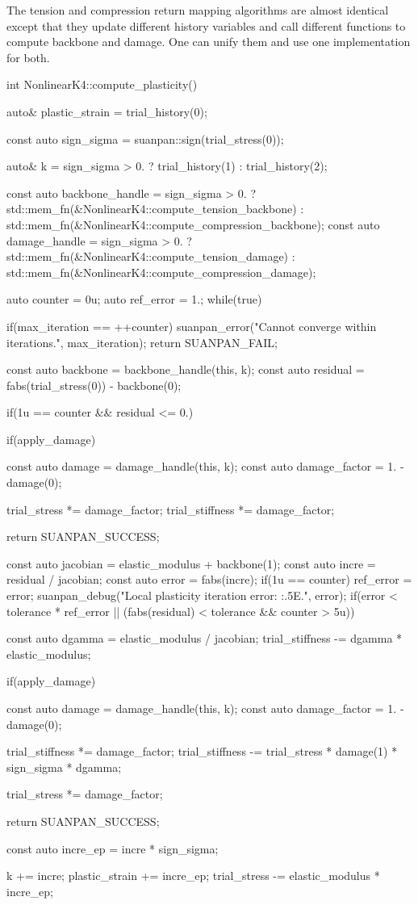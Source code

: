 The tension and compression return mapping algorithms are almost identical except that they update different history variables and call different functions to compute backbone and damage. One can unify them and use one implementation for both.
\begin{cppcode}
int NonlinearK4::compute_plasticity() {
    auto& plastic_strain = trial_history(0);

    const auto sign_sigma = suanpan::sign(trial_stress(0));

    auto& k = sign_sigma > 0. ? trial_history(1) : trial_history(2);

    const auto backbone_handle = sign_sigma > 0. ? std::mem_fn(&NonlinearK4::compute_tension_backbone) : std::mem_fn(&NonlinearK4::compute_compression_backbone);
    const auto damage_handle = sign_sigma > 0. ? std::mem_fn(&NonlinearK4::compute_tension_damage) : std::mem_fn(&NonlinearK4::compute_compression_damage);

    auto counter = 0u;
    auto ref_error = 1.;
    while(true) {
        if(max_iteration == ++counter) {
            suanpan_error("Cannot converge within {} iterations.\n", max_iteration);
            return SUANPAN_FAIL;
        }

        const auto backbone = backbone_handle(this, k);
        const auto residual = fabs(trial_stress(0)) - backbone(0);

        if(1u == counter && residual <= 0.) {
            if(apply_damage) {
                const auto damage = damage_handle(this, k);
                const auto damage_factor = 1. - damage(0);

                trial_stress *= damage_factor;
                trial_stiffness *= damage_factor;
            }

            return SUANPAN_SUCCESS;
        }

        const auto jacobian = elastic_modulus + backbone(1);
        const auto incre = residual / jacobian;
        const auto error = fabs(incre);
        if(1u == counter) ref_error = error;
        suanpan_debug("Local plasticity iteration error: {:.5E}.\n", error);
        if(error < tolerance * ref_error || (fabs(residual) < tolerance && counter > 5u)) {
            const auto dgamma = elastic_modulus / jacobian;
            trial_stiffness -= dgamma * elastic_modulus;

            if(apply_damage) {
                const auto damage = damage_handle(this, k);
                const auto damage_factor = 1. - damage(0);

                trial_stiffness *= damage_factor;
                trial_stiffness -= trial_stress * damage(1) * sign_sigma * dgamma;

                trial_stress *= damage_factor;
            }

            return SUANPAN_SUCCESS;
        }

        const auto incre_ep = incre * sign_sigma;

        k += incre;
        plastic_strain += incre_ep;
        trial_stress -= elastic_modulus * incre_ep;
    }
}
\end{cppcode}


